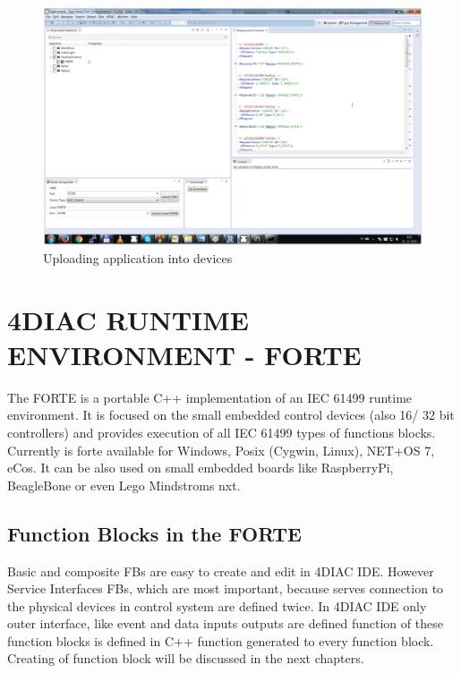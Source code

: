 \begin{figure}[hbp]
\centering
\includegraphics[scale=0.3]{Figures/deploymentperspective}
\decoRule
\caption[4DIAC IDE Deployment Perspective ]{Uploading application into devices}
\label{4DIAC IDE Deployment Perspective}
\end{figure}



\section{4DIAC RUNTIME ENVIRONMENT - FORTE}


The FORTE is a portable C++ implementation of an IEC 61499 runtime environment. It is focused on the small embedded control devices (also 16/ 32 bit controllers) and provides execution of all IEC 61499 types of functions blocks. Currently is forte available for Windows, Posix (Cygwin, Linux), NET+OS 7, eCos. It can be also used on small embedded boards like RaspberryPi, BeagleBone or even Lego Mindstroms nxt. 

\subsection{Function Blocks in the FORTE}
Basic and composite FBs are easy to create and edit in 4DIAC IDE. 
However Service Interfaces FBs, which are most important, because serves connection to the physical devices in control system are defined twice. 
In 4DIAC IDE only outer interface, like event and data inputs outputs are defined function of these function blocks is defined in C++ function generated to every function block. Creating of function block will be discussed in the next chapters. 


